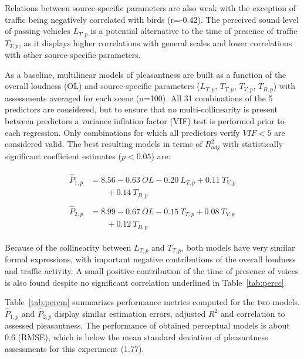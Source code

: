 \documentclass[twocolumn]{article}
\begin{document}
Relations between source-specific parameters are also weak with the exception of traffic being negatively correlated with birds (r=-0.42). The perceived sound level of passing vehicles $L_{T, p}$ is a potential alternative to the time of presence of traffic $T_{T, p}$, as it displays higher correlations with general scales and lower correlations with other source-specific parameters.

As a baseline, multilinear models of pleasantness are built as a function of the overall loudness (OL) and source-specific parameters ($L_{T, p}$, $T_{T, p}$, $T_{V, p}$, $T_{B, p}$) with assessments averaged for each scene (n=100). All 31 combinations of the 5 predictors are considered, but to ensure that no multi-collinearity is present between predictors a variance inflation factor (VIF) test is performed prior to each regression. Only combinations for which all predictors verify $VIF<5$ are considered valid. The best resulting models in terms of $R^2_{adj}$ with statistically significant coefficient estimates ($p<0.05$) are:

\begin{align}
\begin{split}
\hat P_{1, p} & = 8.56 - 0.63~OL - 0.20~L_{T, p} + 0.11~T_{V, p}\\
&\qquad + 0.14~T_{B, p} \label{eq:pp1}
\end{split}\\
\begin{split}
\hat P_{2, p} & = 8.99 - 0.67~OL - 0.15~T_{T, p} + 0.08~T_{V, p}\\
&\qquad + 0.12~T_{B, p} \label{eq:pp2}
\end{split}
\end{align}

Because of the collinearity between $L_{T, p}$ and $T_{T, p}$, both models have very similar formal expressions, with important negative contributions of the overall loudness and traffic activity. A small positive contribution of the time of presence of voices is also found despite no significant correlation underlined in Table~\ref{tab:percc}.

Table~\ref{tab:percm} summarizes performance metrics computed for the two models. $\hat P_{1, p}$ and $\hat P_{2, p}$ display similar estimation errors, adjusted $R^2$ and correlation to assessed pleasantness. The performance of obtained perceptual models is about 0.6 (RMSE), which is below the mean standard deviation of pleasantness assessments for this experiment (1.77).
\end{document}
